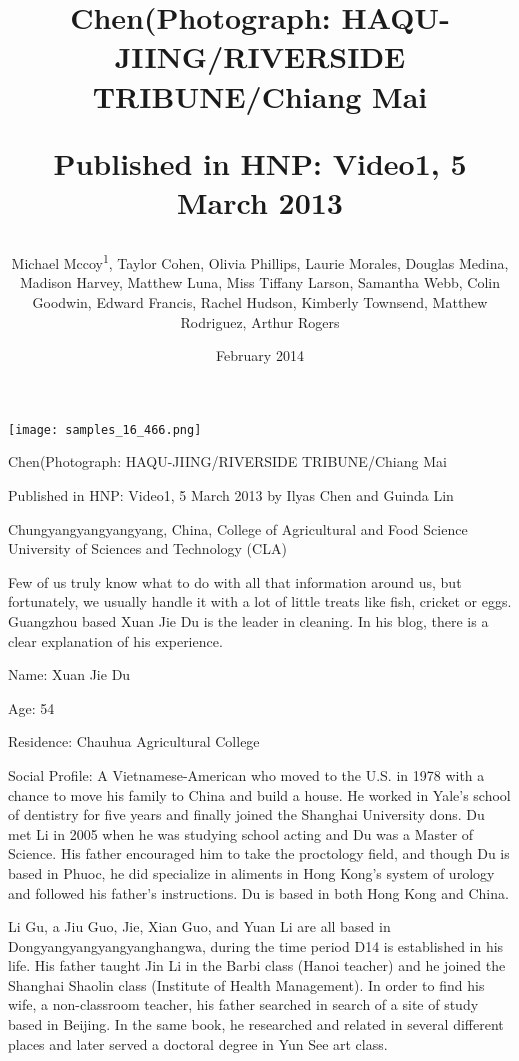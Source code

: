 \documentclass{article}
\title{Chen(Photograph: HAQU-JIING/RIVERSIDE TRIBUNE/Chiang Mai

Published in HNP: Video1, 5 March 2013}
\author{Michael Mccoy\textsuperscript{1},  Taylor Cohen,  Olivia Phillips,  Laurie Morales,  Douglas Medina,  Madison Harvey,  Matthew Luna,  Miss Tiffany Larson,  Samantha Webb,  Colin Goodwin,  Edward Francis,  Rachel Hudson,  Kimberly Townsend,  Matthew Rodriguez,  Arthur Rogers}
\affil{\textsuperscript{1}Thammasat University (Rangsit Campus)}
\date{February 2014}
\begin{document}
\maketitle

\begin{center}
\begin{minipage}{0.75\linewidth}
\texttt{[image: samples\_16\_466.png]}
\end{minipage}
\end{center}

Chen(Photograph: HAQU-JIING/RIVERSIDE TRIBUNE/Chiang Mai

Published in HNP: Video1, 5 March 2013 by Ilyas Chen and Guinda Lin

Chungyangyangyangyang, China, College of Agricultural and Food Science University of Sciences and Technology (CLA)

Few of us truly know what to do with all that information around us, but fortunately, we usually handle it with a lot of little treats like fish, cricket or eggs. Guangzhou based Xuan Jie Du is the leader in cleaning. In his blog, there is a clear explanation of his experience.

Name: Xuan Jie Du

Age: 54

Residence: Chauhua Agricultural College

Social Profile: A Vietnamese-American who moved to the U.S. in 1978 with a chance to move his family to China and build a house. He worked in Yale's school of dentistry for five years and finally joined the Shanghai University dons. Du met Li in 2005 when he was studying school acting and Du was a Master of Science. His father encouraged him to take the proctology field, and though Du is based in Phuoc, he did specialize in aliments in Hong Kong's system of urology and followed his father's instructions. Du is based in both Hong Kong and China.

Li Gu, a Jiu Guo, Jie, Xian Guo, and Yuan Li are all based in Dongyangyangyangyanghangwa, during the time period D14 is established in his life. His father taught Jin Li in the Barbi class (Hanoi teacher) and he joined the Shanghai Shaolin class (Institute of Health Management). In order to find his wife, a non-classroom teacher, his father searched in search of a site of study based in Beijing. In the same book, he researched and related in several different places and later served a doctoral degree in Yun See art class.
\end{document}
